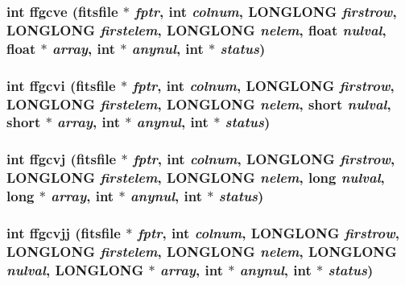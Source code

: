 \subsubsection{\setlength{\rightskip}{0pt plus 5cm}int ffgcve (\bf{fitsfile} $\ast$ {\em fptr}, int {\em colnum}, \bf{LONGLONG} {\em firstrow}, \bf{LONGLONG} {\em firstelem}, \bf{LONGLONG} {\em nelem}, float {\em nulval}, float $\ast$ {\em array}, int $\ast$ {\em anynul}, int $\ast$ {\em status})}\label{fitsio__64_8h_66537a8f5d81daef1031af6e56dfb68d}


\subsubsection{\setlength{\rightskip}{0pt plus 5cm}int ffgcvi (\bf{fitsfile} $\ast$ {\em fptr}, int {\em colnum}, \bf{LONGLONG} {\em firstrow}, \bf{LONGLONG} {\em firstelem}, \bf{LONGLONG} {\em nelem}, short {\em nulval}, short $\ast$ {\em array}, int $\ast$ {\em anynul}, int $\ast$ {\em status})}\label{fitsio__64_8h_3c75d5377fd8e2ad2df15494ff2a2825}


\subsubsection{\setlength{\rightskip}{0pt plus 5cm}int ffgcvj (\bf{fitsfile} $\ast$ {\em fptr}, int {\em colnum}, \bf{LONGLONG} {\em firstrow}, \bf{LONGLONG} {\em firstelem}, \bf{LONGLONG} {\em nelem}, long {\em nulval}, long $\ast$ {\em array}, int $\ast$ {\em anynul}, int $\ast$ {\em status})}\label{fitsio__64_8h_3e834544d66dd18b076a540fe0b76b71}


\subsubsection{\setlength{\rightskip}{0pt plus 5cm}int ffgcvjj (\bf{fitsfile} $\ast$ {\em fptr}, int {\em colnum}, \bf{LONGLONG} {\em firstrow}, \bf{LONGLONG} {\em firstelem}, \bf{LONGLONG} {\em nelem}, \bf{LONGLONG} {\em nulval}, \bf{LONGLONG} $\ast$ {\em array}, int $\ast$ {\em anynul}, int $\ast$ {\em status})}\label{fitsio__64_8h_3ff4e550740bd56040b55dfa1774f735}


